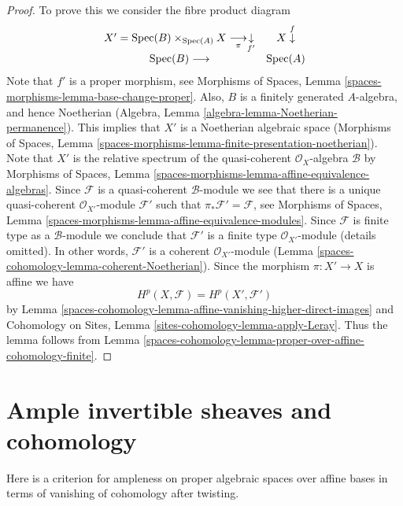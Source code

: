\begin{proof}
To prove this we consider the fibre product diagram
$$
\begin{array}{cc}X' = \operatorname{Spec}(B) \times_{\operatorname{Spec}(A)} X
\underset{\pi}{\longrightarrow}\underset{f'}{\downarrow} & X \overset{f}{\downarrow} \\ \operatorname{Spec}(B) \longrightarrow & \operatorname{Spec}(A)\end{array}
$$
Note that $f'$ is a proper morphism, see
Morphisms of Spaces, Lemma \ref{spaces-morphisms-lemma-base-change-proper}.
Also, $B$ is a finitely generated $A$-algebra, and hence
Noetherian (Algebra, Lemma \ref{algebra-lemma-Noetherian-permanence}).
This implies that $X'$ is a Noetherian algebraic space
(Morphisms of Spaces, Lemma
\ref{spaces-morphisms-lemma-finite-presentation-noetherian}).
Note that $X'$ is the relative spectrum of the quasi-coherent
$\mathcal{O}_X$-algebra $\mathcal{B}$ by
Morphisms of Spaces, Lemma
\ref{spaces-morphisms-lemma-affine-equivalence-algebras}.
Since $\mathcal{F}$ is a quasi-coherent $\mathcal{B}$-module
we see that there is a unique quasi-coherent
$\mathcal{O}_{X'}$-module $\mathcal{F}'$ such that
$\pi_*\mathcal{F}' = \mathcal{F}$, see
Morphisms of Spaces, Lemma
\ref{spaces-morphisms-lemma-affine-equivalence-modules}.
Since $\mathcal{F}$ is finite type as a $\mathcal{B}$-module we
conclude that $\mathcal{F}'$ is a finite type
$\mathcal{O}_{X'}$-module (details omitted). In other words,
$\mathcal{F}'$ is a coherent $\mathcal{O}_{X'}$-module
(Lemma \ref{spaces-cohomology-lemma-coherent-Noetherian}).
Since the morphism $\pi : X' \to X$ is affine we have
$$
H^p(X, \mathcal{F}) = H^p(X', \mathcal{F}')
$$
by
Lemma \ref{spaces-cohomology-lemma-affine-vanishing-higher-direct-images}
and
Cohomology on Sites, Lemma \ref{sites-cohomology-lemma-apply-Leray}.
Thus the lemma follows from
Lemma \ref{spaces-cohomology-lemma-proper-over-affine-cohomology-finite}.
\end{proof}

\section{Ample invertible sheaves and cohomology}
\label{spaces-cohomology-section-ample-cohomology}
Here is a criterion for ampleness on proper algebraic spaces over affine bases
in terms of vanishing of cohomology after twisting.


